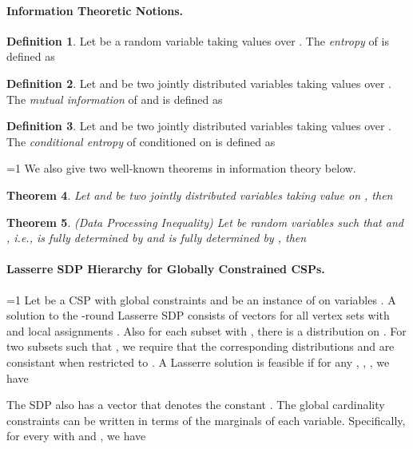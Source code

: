 \documentclass[11pt]{article}
\def\full{1}
\newtheorem{theorem}{Theorem}[section]
\theoremstyle{definition}
\newtheorem{definition}[theorem]{Definition}
\newcommand{\ie}{i.e.,\xspace}
\numberwithin{equation}{section}
\let\origparagraph\paragraph
\renewcommand{\paragraph}[1]{\origparagraph{#1.}}
\begin{document}
\paragraph{Information Theoretic Notions}
\begin{definition} \label{def:entropy}
Let  be a random variable taking values over . The \emph{entropy} of  is defined as

\end{definition}
\begin{definition}\label{def:mutualinfo}
Let  and  be two jointly distributed variables taking values over . The \emph{mutual information} of  and  is defined as

\end{definition}
\begin{definition}\label{def:conditionalentropy}
Let  and  be two jointly distributed variables taking values over . The \emph{conditional entropy} of  conditioned on  is defined as

\end{definition}
\ifnum\full=1
We also give two well-known theorems in information theory below.
\begin{theorem} \label{thm:entropy-info}
Let  and  be two jointly distributed variables taking value on , then

\end{theorem}
\begin{theorem} \label{thm:dataprocessing} (Data Processing
Inequality)
Let  be random variables such that  and , \ie  is fully determined by  and  is fully determined by , then

\end{theorem}
\fi

\paragraph{Lasserre SDP Hierarchy for Globally Constrained CSPs} \label{subsec:lasserresdp}

\ifnum\full=1
Let  be a CSP with global constraints
and  be an instance of
 on variables . A solution to the
-round Lasserre SDP consists of vectors  for all
vertex sets  with  and local assignments
. Also for each subset  with , there is a distribution  on . For two subsets
 such that , we require that the corresponding
distributions  and  are consistant when restricted to . A Lasserre solution is feasible if for any , , , we have

The SDP also has a vector  that denotes the constant .  The global cardinality constraints can be written in terms of the
marginals of each variable. Specifically, for every  with  and , we have
\end{document}
